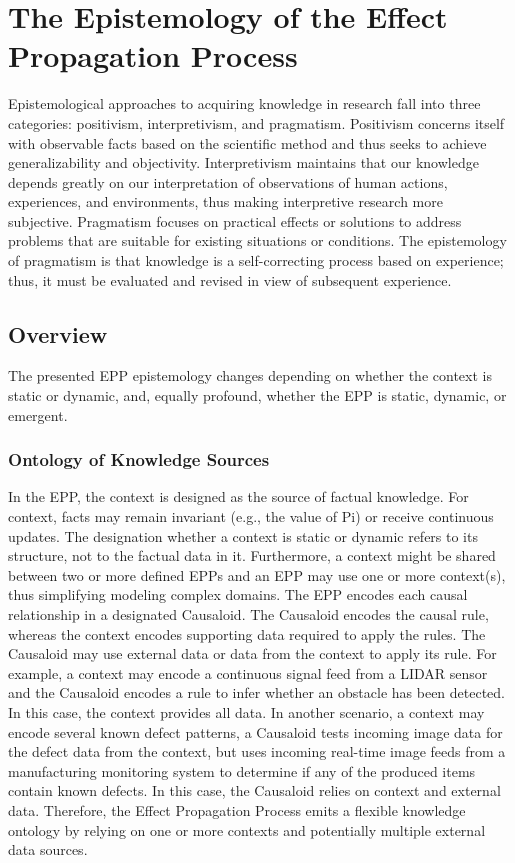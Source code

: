 \section{The Epistemology of the Effect Propagation Process}
\label{sec:epp_epistemology}

Epistemological approaches to acquiring knowledge in research fall into three categories: positivism, interpretivism, and pragmatism. Positivism concerns itself with observable facts based on the scientific method and thus seeks to achieve generalizability and objectivity. Interpretivism maintains that our knowledge depends greatly on our interpretation of observations of human actions, experiences, and environments, thus making interpretive research more subjective. Pragmatism focuses on practical effects or solutions to address problems that are suitable for existing situations or conditions. The epistemology of pragmatism is that knowledge is a self-correcting process based on experience; thus, it must be evaluated and revised in view of subsequent experience.

\subsection{Overview}

The presented EPP epistemology changes depending on whether the context is static or dynamic, and, equally profound, whether the EPP is static, dynamic, or emergent.

\subsubsection{Ontology of Knowledge Sources}

In the EPP, the context is designed as the source of factual knowledge. For context, facts may remain invariant (e.g., the value of Pi) or receive continuous updates. The designation whether a context is static or dynamic refers to its structure, not to the factual data in it. Furthermore, a context might be shared between two or more defined EPPs and an EPP may use one or more context(s), thus simplifying modeling complex domains.
The EPP encodes each causal relationship in a designated Causaloid. The Causaloid encodes the causal rule, whereas the context encodes supporting data required to apply the rules. The Causaloid may use external data or data from the context to apply its rule.
For example, a context may encode a continuous signal feed from a LIDAR sensor and the Causaloid encodes a rule to infer whether an obstacle has been detected. In this case, the context provides all data. In another scenario, a context may encode several known defect patterns, a Causaloid tests incoming image data for the defect data from the context, but uses incoming real-time image feeds from a manufacturing monitoring system to determine if any of the produced items contain known defects. In this case, the Causaloid relies on context and external data. Therefore, the Effect Propagation Process emits a flexible knowledge ontology by relying on one or more contexts and potentially multiple external data sources.

